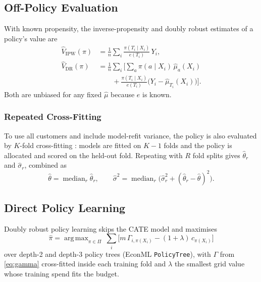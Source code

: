 \documentclass[10pt,twocolumn]{article}
\newcommand{\muh}{\hat{\mu}}
\DeclareMathOperator*{\argmax}{arg\,max}
\begin{document}
\subsection{Off-Policy Evaluation}
With known propensity, the inverse-propensity \citep{horvitz1952} and doubly robust
\citep{robins1994,dudik2011} estimates of a policy's value are
\begin{align}
  \hat V_{\text{IPW}}(\pi) &= \frac1n\sum_i \frac{\pi(T_i\mid X_i)}{e(T_i)}\,Y_i, \\
  \hat V_{\text{DR}}(\pi)  &= \frac1n\sum_i \Big[\sum_a \pi(a\mid X_i)\,\muh_a(X_i) \nonumber\\
     &\qquad + \frac{\pi(T_i\mid X_i)}{e(T_i)}\big(Y_i-\muh_{T_i}(X_i)\big)\Big].
  \label{eq:dr}
\end{align}
Both are unbiased for any fixed $\muh$ because $e$ is known.

\subsubsection{Repeated Cross-Fitting}
To use all customers and include model-refit variance, the policy is also evaluated by $K$-fold
cross-fitting \citep{chernozhukov2018}: models are fitted on $K-1$ folds and the policy is allocated
and scored on the held-out fold. Repeating with $R$ fold splits gives $\hat\theta_r$ and
$\hat\sigma_r$, combined as
\begin{equation}
  \hat\theta = \operatorname{median}_r \hat\theta_r,\qquad
  \hat\sigma^2 = \operatorname{median}_r\big(\hat\sigma_r^2 + (\hat\theta_r-\hat\theta)^2\big).
  \label{eq:dml}
\end{equation}

\subsection{Direct Policy Learning}
Doubly robust policy learning \citep{athey2021} skips the CATE model and maximises
\begin{equation}
  \hat\pi = \argmax_{\pi\in\Pi}\ \sum_i \Big[m\,\Gamma_{i,\pi(X_i)} - (1+\lambda)\,c_{\pi(X_i)}\Big]
\end{equation}
over depth-2 and depth-3 policy trees (EconML \texttt{PolicyTree}), with $\Gamma$ from
\eqref{eq:gamma} cross-fitted inside each training fold and $\lambda$ the smallest grid value whose
training spend fits the budget.
\end{document}
